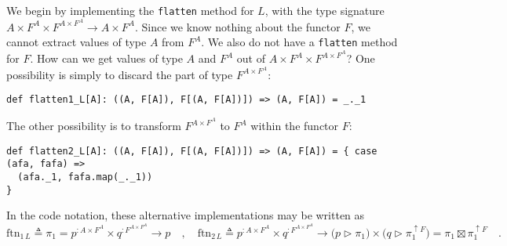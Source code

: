 We begin by implementing the \lstinline!flatten! method for $L$,
with the type signature $A\times F^{A}\times F^{A\times F^{A}}\rightarrow A\times F^{A}$.
Since we know nothing about the functor $F$, we cannot extract values
of type $A$ from $F^{A}$. We also do not have a \lstinline!flatten!
method for $F$. How can we get values of type $A$ and $F^{A}$ out
of $A\times F^{A}\times F^{A\times F^{A}}$? One possibility is simply
to discard the part of type $F^{A\times F^{A}}$:
\begin{lstlisting}
def flatten1_L[A]: ((A, F[A]), F[(A, F[A])]) => (A, F[A]) = _._1
\end{lstlisting}
The other possibility is to transform $F^{A\times F^{A}}$ to $F^{A}$
within the functor $F$:
\begin{lstlisting}
def flatten2_L[A]: ((A, F[A]), F[(A, F[A])]) => (A, F[A]) = { case (afa, fafa) =>
  (afa._1, fafa.map(_._1))
}
\end{lstlisting}
In the code notation, these alternative implementations may be written
as
\[
\text{ftn}_{1\,L}\triangleq\pi_{1}=p^{:A\times F^{A}}\times q^{:F^{A\times F^{A}}}\rightarrow p\quad,\quad\text{ftn}_{2\,L}\triangleq p^{:A\times F^{A}}\times q^{:F^{A\times F^{A}}}\rightarrow\big(p\triangleright\pi_{1}\big)\times\big(q\triangleright\pi_{1}^{\uparrow F}\big)=\pi_{1}\boxtimes\pi_{1}^{\uparrow F}\quad.
\]


